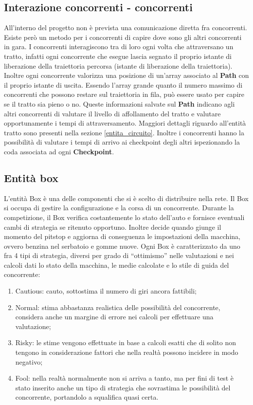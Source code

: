 \subsection{Interazione concorrenti - concorrenti}
All'interno del progetto non è prevista una comunicazione diretta fra
concorrenti. Esiste però un metodo per i concorrenti di capire dove sono gli
altri concorrenti in gara. I concorrenti interagiscono tra di loro ogni volta
che attraversano un tratto, infatti ogni concorrente che esegue lascia segnato
il proprio istante di liberazione della traiettoria percorsa (istante di liberazione della traiettoria). 
Inoltre ogni concorrente valorizza una posizione di un'array associato al \textbf{Path}
con il proprio istante di uscita. Essendo l'array grande quanto il numero massimo di concorrenti
che possono restare sul traiettoria in fila, può essere usato per capire se il tratto sia pieno o no.
Queste informazioni salvate sul \textbf{Path}
indicano agli altri concorrenti di valutare il livello di affollamento del tratto e valutare
opportunamente i tempi di attraversamento. Maggiori dettagli riguardo all'entità tratto sono presenti nella sezione
\ref{entita_circuito}. Inoltre i concorrenti hanno la possibilità di valutare i tempi di arrivo ai checkpoint degli altri
ispezionando la coda associata ad ogni \textbf{Checkpoint}.
\subsection{Entità box}
L'entità Box è una delle componenti che si è scelto di distribuire nella rete.
Il Box si occupa di gestire la configurazione e la corsa di un concorrente.
Durante la competizione, il Box verifica costantemente lo stato dell'auto e
fornisce eventuali cambi di strategia se ritenuto opportuno. Inoltre decide
quando giunge il momento del pitstop e aggiorna di conseguenza le impostazioni
della macchina, ovvero benzina nel serbatoio e gomme nuove. Ogni Box è
caratterizzato da uno fra 4 tipi di strategia, diversi per grado di
``ottimismo'' nelle valutazioni e nei calcoli dati lo stato della macchina, le
medie calcolate e lo stile di guida del concorrente:
\begin{enumerate}
\item Cautious: cauto, sottostima il numero di giri ancora fattibili;
\item Normal: stima abbastanza realistica delle possibilità del concorrente,
considera anche un margine di errore nei calcoli per effettuare una valutazione;
\item Risky: le stime vengono effettuate in base a calcoli esatti che di solito
non tengono in considerazione fattori che nella realtà possono incidere in modo
negativo;
\item Fool: nella realtà normalmente non si arriva a tanto, ma per fini di test
è stato inserito anche un tipo di strategia che sovrastima le possibilità del
concorrente, portandolo a squalifica quasi certa.
\end{enumerate}
